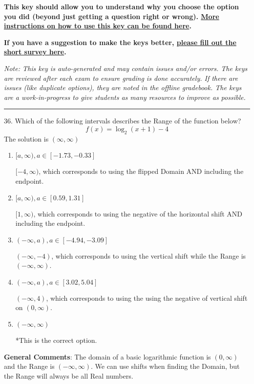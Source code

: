 \documentclass{article}[14pt]
\begin{document}
\textbf{This key should allow you to understand why you choose the option you did (beyond just getting a question right or wrong). \href{https://xronos.clas.ufl.edu/mac1105spring2020/courseDescriptionAndMisc/Exams/LearningFromResults}{More instructions on how to use this key can be found here}.}

\textbf{If you have a suggestion to make the keys better, \href{https://forms.gle/CZkbZmPbC9XALEE88}{please fill out the short survey here}.}

\textit{Note: This key is auto-generated and may contain issues and/or errors. The keys are reviewed after each exam to ensure grading is done accurately. If there are issues (like duplicate options), they are noted in the offline gradebook. The keys are a work-in-progress to give students as many resources to improve as possible.}

\rule{\textwidth}{0.4pt}

36. Which of the following intervals describes the Range of the function below?
$$ f(x) = \log_2{(x+1)}-4 $$ 
The solution is $ (\infty, \infty) $ 

\begin{enumerate}[label=\Alph*.] 
\item $ [a, \infty), a \in [-1.73, -0.33] $ 

 $[-4, \infty)$, which corresponds to using the flipped Domain AND including the endpoint. 
\item $ [a, \infty), a \in [0.59, 1.31] $ 

 $[1, \infty)$, which corresponds to using the negative of the horizontal shift AND including the endpoint. 
\item $ (-\infty, a), a \in [-4.94, -3.09] $ 

 $(-\infty, -4)$, which corresponds to using the vertical shift while the Range is $(-\infty, \infty)$. 
\item $ (-\infty, a), a \in [3.02, 5.04] $ 

 $(-\infty, 4)$, which corresponds to using the using the negative of vertical shift on $(0, \infty)$. 
\item $ (-\infty, \infty) $ 

 *This is the correct option. 
\end{enumerate} 
 
\textbf{General Comments}: The domain of a basic logarithmic function is $(0, \infty)$ and the Range is $(-\infty, \infty)$. We can use shifts when finding the Domain, but the Range will always be all Real numbers.
\end{document}
